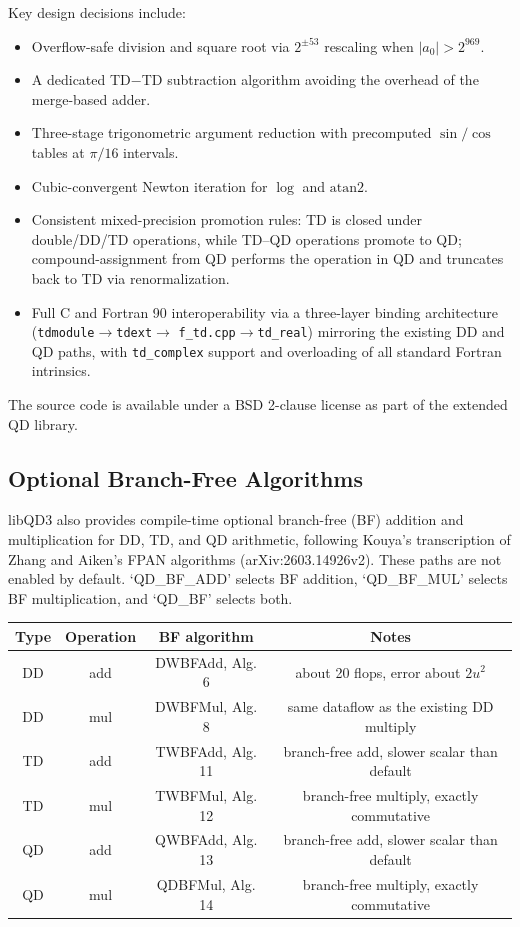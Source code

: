 \documentclass[11pt,a4paper]{article}
\begin{document}
Key design decisions include:
\begin{itemize}
\item Overflow-safe division and square root via $2^{\pm 53}$
  rescaling when $|a_0| > 2^{969}$.
\item A dedicated TD$-$TD subtraction algorithm avoiding the
  overhead of the merge-based adder.
\item Three-stage trigonometric argument reduction with precomputed
  $\sin/\cos$ tables at $\pi/16$ intervals.
\item Cubic-convergent Newton iteration for $\log$ and $\mathrm{atan2}$.
\item Consistent mixed-precision promotion rules: TD is closed under
  double/DD/TD operations, while TD--QD operations promote to QD;
  compound-assignment from QD performs the operation in QD and
  truncates back to TD via renormalization.
\item Full C and Fortran 90 interoperability via a three-layer
  binding architecture (\texttt{tdmodule}$\to$\texttt{tdext}$\to$%
  \texttt{f\_td.cpp}$\to$\texttt{td\_real}) mirroring the existing
  DD and QD paths, with \texttt{td\_complex} support and
  overloading of all standard Fortran intrinsics.
\end{itemize}

The source code is available under a BSD 2-clause license as part
of the extended QD library.

\subsection*{Optional Branch-Free Algorithms}

libQD3 also provides compile-time optional branch-free (BF) addition and
multiplication for DD, TD, and QD arithmetic, following Kouya's transcription of
Zhang and Aiken's FPAN algorithms (arXiv:2603.14926v2).  These paths are not
enabled by default.  `QD_BF_ADD' selects BF addition, `QD_BF_MUL' selects BF
multiplication, and `QD_BF' selects both.

\begin{center}
\begin{tabular}{c|c|c|c}
Type & Operation & BF algorithm & Notes \\
\hline
DD & add & DWBFAdd, Alg. 6 & about 20 flops, error about $2u^2$ \\
DD & mul & DWBFMul, Alg. 8 & same dataflow as the existing DD multiply \\
TD & add & TWBFAdd, Alg. 11 & branch-free add, slower scalar than default \\
TD & mul & TWBFMul, Alg. 12 & branch-free multiply, exactly commutative \\
QD & add & QWBFAdd, Alg. 13 & branch-free add, slower scalar than default \\
QD & mul & QDBFMul, Alg. 14 & branch-free multiply, exactly commutative
\end{tabular}
\end{center}
\end{document}

